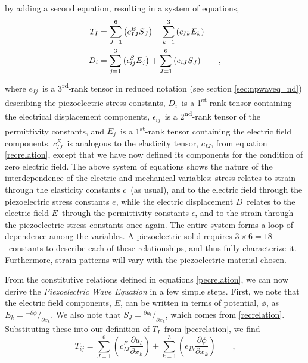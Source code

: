 \documentclass[a4paper,10pt]{report}
\numberwithin{equation}{section}
\begin{document}
{\begin{section}
 by adding a second equation, resulting in a system of equations\cite[p.~24]{Ballantine1997},
\begin{align}
T_I &= \sum_{J=1}^6 \left( c_{IJ}^E S_J \right)- \sum_{k=1}^3 \left( e_{Ik}E_k \right) \notag\\
D_i &= \sum_{j = 1}^3 \left( \epsilon_{ij}^S E_j \right) + \sum_{J = 1}^6 \left( e_{iJ} S_J \right) \qquad \text{,}
\end{align}
where $e_{Ij}$\  is a 3\textsuperscript{rd}-rank tensor in reduced notation (see section \ref{sec:npwaveq_nd}) describing the piezoelectric stress constants, $D_i$\  is a 1\textsuperscript{st}-rank tensor containing the electrical displacement components, $\epsilon_{ij}$\  is a 2\textsuperscript{nd}-rank tensor of the permittivity constants, and $E_j$\  is a 1\textsuperscript{st}-rank tensor containing the electric field components. \cite[p.~24]{Ballantine1997}$c_{IJ}^E$\  is analogous to the elasticity tensor, $c_{IJ}$, from equation \eqref{recrelation}, except that we have now defined its components for the condition of zero electric field. \cite[p.~19]{Kino1987} The above system of equations shows the nature of the interdependence of the electric and mechanical variables: stress relates to strain through the elasticity constants $c$\  (as usual), and to the electric field through the piezoelectric stress constants $e$, while the electric displacement $D$\  relates to the electric field $E$\  through the permittivity 
constants $\epsilon$, and to the strain through the piezoelectric stress constants once again. The entire system forms a loop of dependence among the variables. A piezoelectric solid requires $3\times6 = 18$\  constants to describe each of these relationships, and thus fully characterize it. Furthermore, strain patterns will vary with the piezoelectric material chosen. \cite[p.~24]{Ballantine1997}
\par
From the constitutive relations defined in equations \eqref{pecrelation}, we can now derive the \emph{Piezoelectric Wave Equation} in a few simple steps. First, we note that the electric field components, $E$, can be written in terms of potential, $\phi$, as $E_k = {}^{-\partial \phi}/_{\partial x_k}$. We also note that $S_J = {}^{\partial u_l}/_{\partial x_k}$, which comes from \eqref{recrelation}. Substituting these into our definition of $T_I$\  from \eqref{pecrelation}, we find\cite[p.~26]{Ballantine1997}
\begin{equation}
T_{ij} = \sum_{J=1}^6 \left( c_{IJ}^E \frac{\partial u_l}{\partial x_k}\right) + \sum_{k=1}^3 \left( e_{Ik} \frac{\partial \phi}{\partial x_k} \right) \qquad \text{,}

\end{equation}
\end{section}}
\end{document}
